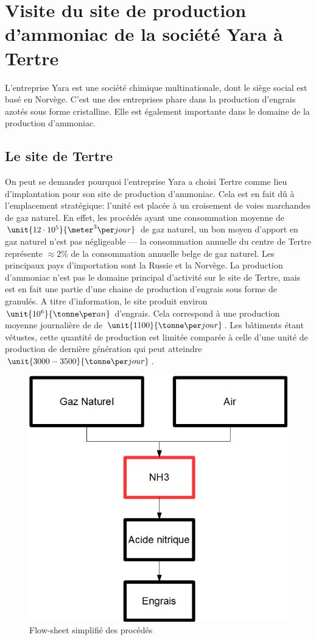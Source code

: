 \section{Visite du site de production d'ammoniac de la société Yara à Tertre}
L'entreprise Yara est une société chimique multinationale, dont le siège social est basé en Norvège. C'est une des entreprises phare dans la production d'engrais azotés sous forme cristalline. Elle est également importante dans le domaine de la production d'ammoniac.
\subsection{Le site de Tertre}
On peut se demander pourquoi l'entreprise Yara a choisi Tertre comme lieu d'implantation pour son site de production d'ammoniac. Cela est en fait dû à l'emplacement stratégique: l'unité est placée à un croisement de voies marchandes de gaz naturel. En effet, les procédés ayant une consommation moyenne de $\unit{12 \cdot 10^5}{\meter^3\per jour}$ de gaz naturel, un bon moyen d'apport en gaz naturel n'est pas négligeable --- la consommation annuelle du centre de Tertre représente $\approx 2\%$ de la consommation annuelle belge de gaz naturel. Les principaux pays d'importation sont la Russie et la Norvège. La production d'ammoniac n'est pas le domaine principal d'activité sur le site de Tertre, mais est en fait une partie d'une chaine de production d'engrais sous forme de granulés. A titre d'information, le site produit environ $\unit{10^6}{\tonne\per an}$ d'engrais. Cela correspond à une production moyenne journalière de  de $\unit{1100}{\tonne\per jour}$. Les bâtiments étant vétustes, cette quantité de production est limitée comparée à celle d'une unité de production de dernière génération qui peut atteindre $\unit{3000-3500}{\tonne\per jour}$. 
\begin{figure} [h]
\begin{center}
\includegraphics[scale=0.4]{FlYara.png}
\end{center}
\caption{Flow-sheet simplifié des procédés}
\end{figure}

